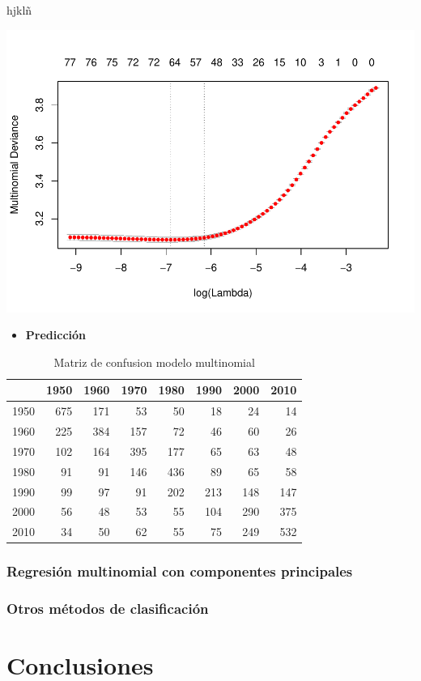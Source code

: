 \documentclass[conference,final,]{IEEEtran}
\providecommand{\tightlist}{%
  \setlength{\itemsep}{0pt}\setlength{\parskip}{0pt}}
\begin{document}
hjklñ

\begin{center}\includegraphics[width=0.6\linewidth]{YearPrediction_Reporte_files/figure-latex/unnamed-chunk-15-1} \end{center}

\begin{itemize}
\tightlist
\item
  \textbf{Predicción}
\end{itemize}

\begin{table}[!t]
\centering
\caption{Matriz de confusion modelo multinomial} 
\begin{tabular}{r|rrrrrrr}
  \hline
 & 1950 & 1960 & 1970 & 1980 & 1990 & 2000 & 2010 \\ 
  \hline
1950 & 675 & 171 &  53 &  50 &  18 &  24 &  14 \\ 
  1960 & 225 & 384 & 157 &  72 &  46 &  60 &  26 \\ 
  1970 & 102 & 164 & 395 & 177 &  65 &  63 &  48 \\ 
  1980 &  91 &  91 & 146 & 436 &  89 &  65 &  58 \\ 
  1990 &  99 &  97 &  91 & 202 & 213 & 148 & 147 \\ 
  2000 &  56 &  48 &  53 &  55 & 104 & 290 & 375 \\ 
  2010 &  34 &  50 &  62 &  55 &  75 & 249 & 532 \\ 
   \hline
\end{tabular}
\end{table}

\hypertarget{regresion-multinomial-con-componentes-principales}{%
\subsubsection{Regresión multinomial con componentes
principales}\label{regresion-multinomial-con-componentes-principales}}

\hypertarget{otros-metodos-de-clasificacion}{%
\subsubsection{Otros métodos de
clasificación}\label{otros-metodos-de-clasificacion}}

\hypertarget{conclusiones}{%
\section{Conclusiones}\label{conclusiones}}
\end{document}
